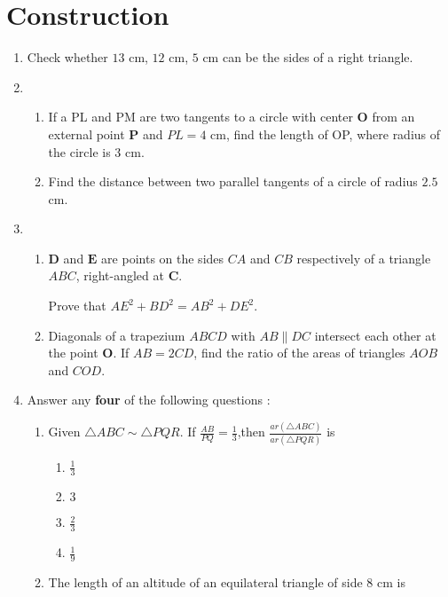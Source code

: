 \documentclass{article}
\let\vec\mathbf
\begin{document}
\section*{\centering Construction}
\begin{enumerate}
\item Check whether $13$ cm, $12$ cm, $5$ cm can be the sides of a right triangle.
\item \begin{enumerate}
    \item If a PL and PM are two tangents to a circle with center $\vec{O}$ from an external point $\vec{P}$ and $PL=4$ cm, find the length of OP, where radius of the circle is $3$ cm.
    \item Find the distance between two parallel tangents of a circle of radius $2.5$ cm.
\end{enumerate}
    \item 
    \begin{enumerate}
    \item $\vec{D}$ and $\vec{E}$ are points on the sides $CA$ and $CB$ respectively of  a triangle $ABC$, right-angled at $\vec{C}$.
    
    Prove that $AE^2+BD^2=AB^2+DE^2$.
    
    \item Diagonals of a trapezium $ABCD$ with $AB\parallel DC$ intersect each other at the point $\vec{O}$. If $AB=2CD$, find the ratio of the areas of triangles $AOB$ and $COD$.
    \end{enumerate}

    \item Answer any \textbf{four} of the following questions :
      \begin{enumerate}[label=(\roman*)]
        \item Given $\triangle ABC \sim \triangle PQR$. If $\frac{AB}{PQ}=\frac{1}{3}$,then $\frac{ar(\triangle ABC)}{ar(\triangle PQR)}$ is 
        \begin{enumerate}[label=(\Alph*)]
            \item $\frac{1}{3}$
            \item $3$
            \item $\frac{2}{3}$
            \item $\frac{1}{9}$
        \end{enumerate}
        
        \item The length of an altitude of an equilateral triangle of side $8$ cm is
        

\end{enumerate}
\end{enumerate}
\end{document}
